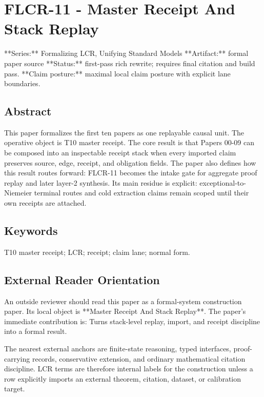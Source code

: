 \documentclass[11pt]{article}
\begin{document}
\section*{FLCR-11 - Master Receipt And Stack Replay}

**Series:** Formalizing LCR, Unifying Standard Models
**Artifact:** formal paper source
**Status:** first-pass rich rewrite; requires final citation and build pass.
**Claim posture:** maximal local claim posture with explicit lane boundaries.

\subsection*{Abstract}

This paper formalizes the first ten papers as one replayable causal unit. The operative object is T10 master receipt. The core result is that Papers 00-09 can be composed into an inspectable receipt stack when every imported claim preserves source, edge, receipt, and obligation fields. The paper also defines how this result routes forward: FLCR-11 becomes the intake gate for aggregate proof replay and later layer-2 synthesis. Its main residue is explicit: exceptional-to-Niemeier terminal routes and cold extraction claims remain scoped until their own receipts are attached.

\subsection*{Keywords}

T10 master receipt; LCR; receipt; claim lane; normal form.

\subsection*{External Reader Orientation}

An outside reviewer should read this paper as a formal-system construction paper. Its local object is **Master Receipt And Stack Replay**. The paper's immediate contribution is: Turns stack-level replay, import, and receipt discipline into a formal result.

The nearest external anchors are finite-state reasoning, typed interfaces, proof-carrying records, conservative extension, and ordinary mathematical citation discipline. LCR terms are therefore internal labels for the construction unless a row explicitly imports an external theorem, citation, dataset, or calibration target.
\end{document}

